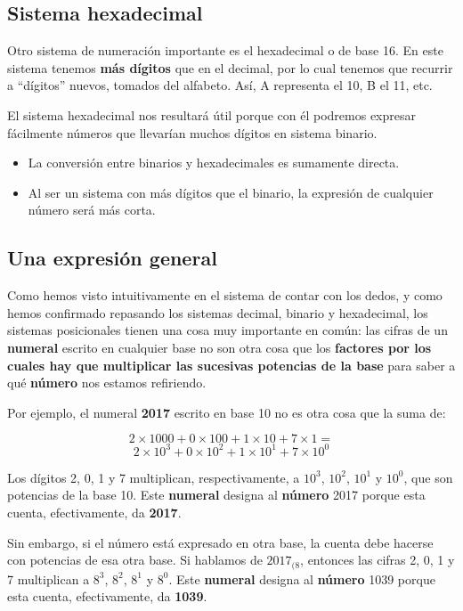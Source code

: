 \documentclass[spanish,a4paper,]{article}
\providecommand{\tightlist}{%
  \setlength{\itemsep}{0pt}\setlength{\parskip}{0pt}}
\begin{document}
\hypertarget{sistema-hexadecimal}{%
\subsection{Sistema hexadecimal}\label{sistema-hexadecimal}}

Otro sistema de numeración importante es el hexadecimal o de base 16. En
este sistema tenemos \textbf{más dígitos} que en el decimal, por lo cual
tenemos que recurrir a ``dígitos'' nuevos, tomados del alfabeto. Así, A
representa el 10, B el 11, etc.

El sistema hexadecimal nos resultará útil porque con él podremos
expresar fácilmente números que llevarían muchos dígitos en sistema
binario.

\begin{itemize}
\tightlist
\item
  La conversión entre binarios y hexadecimales es sumamente directa.
\item
  Al ser un sistema con más dígitos que el binario, la expresión de
  cualquier número será más corta.
\end{itemize}

\hypertarget{una-expresiuxf3n-general}{%
\subsection{Una expresión general}\label{una-expresiuxf3n-general}}

Como hemos visto intuitivamente en el sistema de contar con los dedos, y
como hemos confirmado repasando los sistemas decimal, binario y
hexadecimal, los sistemas posicionales tienen una cosa muy importante en
común: las cifras de un \textbf{numeral} escrito en cualquier base no
son otra cosa que los \textbf{factores por los cuales hay que
multiplicar las sucesivas potencias de la base} para saber a qué
\textbf{número} nos estamos refiriendo.

Por ejemplo, el numeral \textbf{2017} escrito en base 10 no es otra cosa
que la suma de:

\[2 \times 1000 + 0 \times 100 + 1 \times 10 + 7 \times 1 = \]
\[2 \times 10^3 + 0 \times 10^2 + 1 \times 10^1 + 7 \times 10^0\]

Los dígitos 2, 0, 1 y 7 multiplican, respectivamente, a \(10^3\),
\(10^2\), \(10^1\) y \(10^0\), que son potencias de la base 10. Este
\textbf{numeral} designa al \textbf{número} 2017 porque esta cuenta,
efectivamente, da \textbf{2017}.

Sin embargo, si el número está expresado en otra base, la cuenta debe
hacerse con potencias de esa otra base. Si hablamos de \(2017_{(8}\),
entonces las cifras 2, 0, 1 y 7 multiplican a \(8^3\), \(8^2\), \(8^1\)
y \(8^0\). Este \textbf{numeral} designa al \textbf{número} 1039 porque
esta cuenta, efectivamente, da \textbf{1039}.
\end{document}
